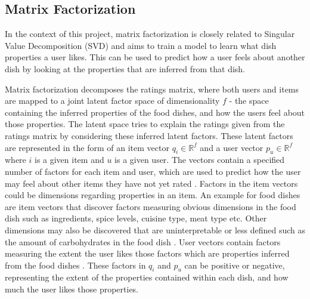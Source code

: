 \subsection{Matrix Factorization}


In the context of this project, matrix factorization is closely related to Singular Value Decomposition (SVD) \cite{koren2009matrix} and aims to train a model to learn what dish properties a user likes. This can be used to predict how a user feels about another dish by looking at the properties that are inferred from that dish.

Matrix factorization decomposes the ratings matrix, where both users and items are mapped to a joint latent factor space of dimensionality \begin{math} f \end{math} - the space containing the inferred properties of the food dishes, and how the users feel about those properties. The latent space tries to explain the ratings given from the ratings matrix by considering these inferred latent factors. These latent factors are represented in the form of an item vector \begin{math} q_{i} \in \mathbb{R}^f  \end{math} and a user vector \begin{math} p_{u} \in \mathbb{R}^f  \end{math} where \begin{math} i \end{math} is a given item and \begin{math} u \end{math} is a given user. The vectors contain a specified number of factors for each item and user, which are used to predict how the user may feel about other items they have not yet rated \cite{koren2009matrix}. Factors in the item vectors could be dimensions regarding properties in an item. An example for food dishes are item vectors that discover factors measuring obvious dimensions in the food dish such as ingredients, spice levels, cuisine type, meat type etc. Other dimensions may also be discovered that are uninterpretable or less defined such as the amount of carbohydrates in the food dish \cite{koren2009matrix}. User vectors contain factors measuring the extent the user likes those factors which are properties inferred from the food dishes \cite{koren2009matrix}. These factors in \begin{math} q_{i} \end{math} and \begin{math} p_{u} \end{math} can be positive or negative, representing the extent of the properties contained within each dish, and how much the user likes those properties. 

